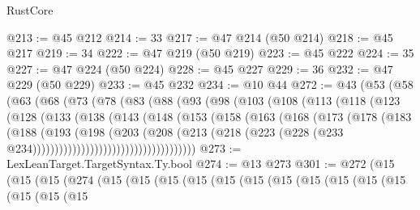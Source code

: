\begin{lexlean}{RustCore}
\begin{coremodule}
@213 := @45 @212
@214 := 33
@217 := @47 @214 (@50 @214)
@218 := @45 @217
@219 := 34
@222 := @47 @219 (@50 @219)
@223 := @45 @222
@224 := 35
@227 := @47 @224 (@50 @224)
@228 := @45 @227
@229 := 36
@232 := @47 @229 (@50 @229)
@233 := @45 @232
@234 := @10 @44
@272 := @43
    (@53
      (@58
        (@63
          (@68
            (@73
              (@78
                (@83
                  (@88
                    (@93
                      (@98
                        (@103
                          (@108
                            (@113
                              (@118
                                (@123
                                  (@128
                                    (@133
                                      (@138
                                        (@143
                                          (@148
                                            (@153
                                              (@158
                                                (@163
                                                  (@168
                                                    (@173
                                                      (@178
                                                        (@183
                                                          (@188
                                                            (@193
                                                              (@198
                                                                (@203
                                                                  (@208
                                                                    (@213
                                                                      (@218
                                                                        (@223
                                                                          (@228
                                                                            (@233
                                                                              @234)))))))))))))))))))))))))))))))))))))
@273 := LexLeanTarget.TargetSyntax.Ty.bool
@274 := @13 @273
@301 := @272
    (@15
      (@15
        (@15
          (@274
            (@15
              (@15
                (@15
                  (@15
                    (@15
                      (@15
                        (@15
                          (@15
                            (@15
                              (@15
                                (@15
                                  (@15
                                    (@15
                                      (@15

\end{coremodule}
\end{lexlean}
